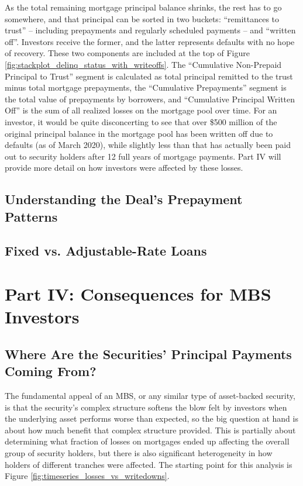 \documentclass[12pt]{article}
\begin{document}
	As the total remaining mortgage principal balance shrinks, the rest has to go somewhere, and that principal can be sorted in two buckets: “remittances to trust” – including prepayments and regularly scheduled payments – and “written off”. Investors receive the former, and the latter represents defaults with no hope of recovery. These two components are included at the top of Figure \ref{fig:stackplot_delinq_status_with_writeoffs}. The “Cumulative Non-Prepaid Principal to Trust” segment is calculated as total principal remitted to the trust minus total mortgage prepayments, the “Cumulative Prepayments” segment is the total value of prepayments by borrowers, and “Cumulative Principal Written Off” is the sum of all realized losses on the mortgage pool over time. For an investor, it would be quite disconcerting to see that over \$500 million of the original principal balance in the mortgage pool has been written off due to defaults (as of March 2020), while slightly less than that has actually been paid out to security holders after 12 full years of mortgage payments. Part IV will provide more detail on how investors were affected by these losses.

\subsection*{Understanding the Deal's Prepayment Patterns}

\subsection*{Fixed vs. Adjustable-Rate Loans}

\section*{Part IV: Consequences for MBS Investors}

\subsection*{Where Are the Securities' Principal Payments Coming From?}

The fundamental appeal of an MBS, or any similar type of asset-backed security, is that the security’s complex structure softens the blow felt by investors when the underlying asset performs worse than expected, so the big question at hand is about how much benefit that complex structure provided. This is partially about determining what fraction of losses on mortgages ended up affecting the overall group of security holders, but there is also significant heterogeneity in how holders of different tranches were affected. The starting point for this analysis is Figure \ref{fig:timeseries_losses_vs_writedowns}.
\end{document}
